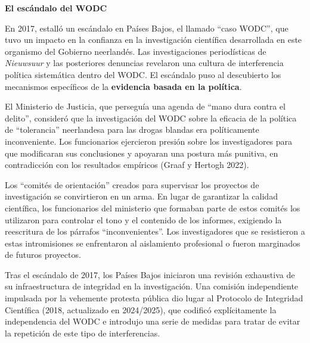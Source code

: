 \documentclass[
  spanish,
  letterpaper,
  DIV=11,
  numbers=noendperiod]{scrreprt}
\begin{document}
\begin{tcolorbox}[enhanced jigsaw, bottomtitle=1mm, toprule=.15mm, colbacktitle=quarto-callout-note-color!10!white, bottomrule=.15mm, leftrule=.75mm, colframe=quarto-callout-note-color-frame, opacitybacktitle=0.6, titlerule=0mm, breakable, colback=white, left=2mm, arc=.35mm, title=\textcolor{quarto-callout-note-color}{\faInfo}\hspace{0.5em}{Nota}, toptitle=1mm, coltitle=black, rightrule=.15mm, opacityback=0]

\textbf{El escándalo del WODC}

En 2017, estalló un escándalo en Países Bajos, el llamado ``caso WODC'',
que tuvo un impacto en la confianza en la investigación científica
desarrollada en este organismo del Gobierno neerlandés. Las
investigaciones periodísticas de \emph{Nieuwsuur} y las posteriores
denuncias revelaron una cultura de interferencia política sistemática
dentro del WODC. El escándalo puso al descubierto los mecanismos
específicos de la \textbf{evidencia basada en la política}.

El Ministerio de Justicia, que perseguía una agenda de ``mano dura
contra el delito'', consideró que la investigación del WODC sobre la
eficacia de la política de ``tolerancia'' neerlandesa para las drogas
blandas era políticamente inconveniente. Los funcionarios ejercieron
presión sobre los investigadores para que modificaran sus conclusiones y
apoyaran una postura más punitiva, en contradicción con los resultados
empíricos (Graaf y Hertogh 2022).

Los ``comités de orientación'' creados para supervisar los proyectos de
investigación se convirtieron en un arma. En lugar de garantizar la
calidad científica, los funcionarios del ministerio que formaban parte
de estos comités los utilizaron para controlar el tono y el contenido de
los informes, exigiendo la reescritura de los párrafos
``inconvenientes''. Los investigadores que se resistieron a estas
intromisiones se enfrentaron al aislamiento profesional o fueron
marginados de futuros proyectos.

Tras el escándalo de 2017, los Países Bajos iniciaron una revisión
exhaustiva de su infraestructura de integridad en la investigación. Una
comisión independiente impulsada por la vehemente protesta pública dio
lugar al Protocolo de Integridad Científica (2018, actualizado en
2024/2025), que codificó explícitamente la independencia del WODC e
introdujo una serie de medidas para tratar de evitar la repetición de
este tipo de interferencias.

\end{tcolorbox}
\end{document}
